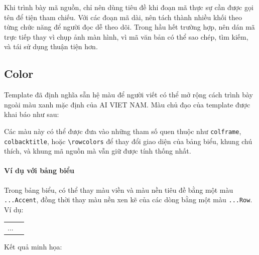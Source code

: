 \documentclass[12pt]{ai_conquer2026}
\begin{document}
Khi trình bày mã nguồn, chỉ nên dùng tiêu đề khi đoạn mã thực sự cần được gọi tên để tiện
tham chiếu. Với các đoạn mã dài, nên tách thành nhiều khối theo từng chức năng để người đọc
dễ theo dõi. Trong hầu hết trường hợp, nên dán mã trực tiếp thay vì chụp ảnh màn hình, vì mã văn bản có thể sao chép, tìm kiếm, và tái sử dụng thuận tiện hơn.
\newpage
\subsection{Color}

Template đã định nghĩa sẵn hệ màu để người viết có thể mở rộng cách trình bày ngoài màu xanh mặc định của AI VIET NAM. Màu chủ đạo của template được khai báo như sau:

\begin{aivnoutputbox}
\end{aivnoutputbox}

Các màu này có thể được đưa vào những tham số quen thuộc như \verb|colframe|, \verb|colbacktitle|, hoặc \verb|\rowcolors| để thay đổi giao diện của bảng biểu, khung chú thích, và khung mã nguồn mà vẫn giữ được tính thống nhất.

\paragraph{Ví dụ với bảng biểu}

Trong bảng biểu, có thể thay màu viền và màu nền tiêu đề bằng một màu \verb|...Accent|, đồng thời thay màu nền xen kẽ của các dòng bằng một màu \verb|...Row|. Ví dụ:

\begin{aivnoutputbox}[]
\begin{tcolorbox}[
  colframe=aivnGreen,      %
  colbacktitle=aivnGreen,  %
  colback=white,
  boxrule=1pt,
  title=\textbf{Bảng thuật ngữ},
  fonttitle=\bfseries\color{white},
  halign title=center,
  arc=5pt
]
\renewcommand{\arraystretch}{1.5}
\renewcommand{\tabularxcolumn}[1]{m{#1}}
\begin{tabularx}{\linewidth}{>{\centering\arraybackslash}m{3.0cm} X}
...
\end{tabularx}
\end{tcolorbox}
\end{aivnoutputbox}

Kết quả minh họa:
\end{document}

